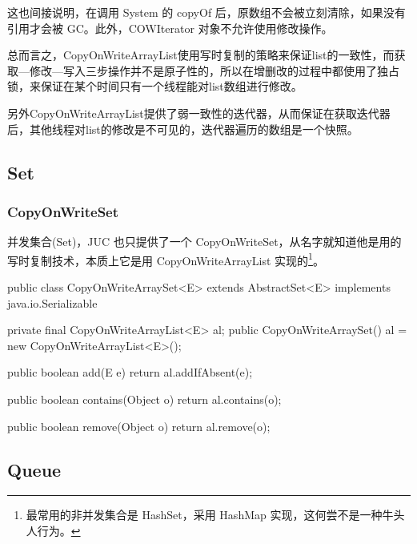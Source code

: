这也间接说明，在调用 System 的 copyOf 后，原数组不会被立刻清除，如果没有引用才会被 GC。此外，COWIterator 对象不允许使用修改操作。

总而言之，CopyOnWriteArrayList使用写时复制的策略来保证list的一致性，而获取—修改—写入三步操作并不是原子性的，所以在增删改的过程中都使用了独占锁，来保证在某个时间只有一个线程能对list数组进行修改。

另外CopyOnWriteArrayList提供了弱一致性的迭代器，从而保证在获取迭代器后，其他线程对list的修改是不可见的，迭代器遍历的数组是一个快照。


\subsection{Set}

\subsubsection{CopyOnWriteSet}

并发集合(Set)，JUC 也只提供了一个 CopyOnWriteSet，从名字就知道他是用的写时复制技术，本质上它是用 CopyOnWriteArrayList 实现的\footnote{最常用的非并发集合是 HashSet，采用 HashMap 实现，这何尝不是一种牛头人行为。}。

\begin{Java}
public class CopyOnWriteArraySet<E> extends AbstractSet<E> implements java.io.Serializable {

    private final CopyOnWriteArrayList<E> al;
    public CopyOnWriteArraySet() {
        al = new CopyOnWriteArrayList<E>();
    }

    public boolean add(E e) {
        return al.addIfAbsent(e);
    }

    public boolean contains(Object o) {
        return al.contains(o);
    }

    public boolean remove(Object o) {
        return al.remove(o);
    }
}
\end{Java}

\subsection{Queue}

